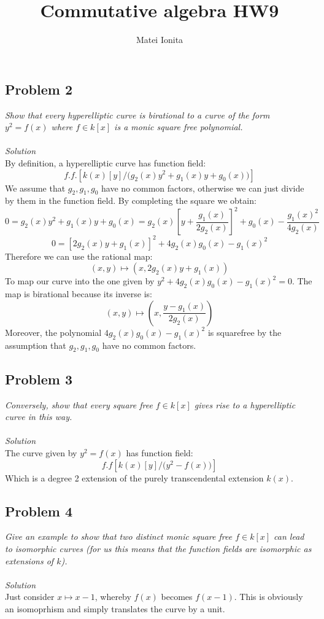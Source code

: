 \documentclass[12 pt]{article}
\title{Commutative algebra HW9}
\author{Matei Ionita}
\begin{document}
  \maketitle


\subsection*{Problem 2}
\emph{Show that every hyperelliptic curve is birational to a curve of the form $y^2 = f(x)$ where $f \in k[x]$ is a monic square free polynomial.}
\\
\\
\emph{Solution}
\\
By definition, a hyperelliptic curve has function field:
\[        f.f. \left[  k(x)[y]/\big(  g_2(x) y^2 + g_1(x) y + g_0(x) \big)   \right]     \]
We assume that $g_2, g_1, g_0$ have no common factors, otherwise we can just divide by them in the function field. By completing the square we obtain:
\[    0 =   g_2(x) y^2 + g_1(x) y + g_0(x) =  g_2(x)  \left[ y + \frac{g_1(x)}{2 g_2(x)} \right]^2  + g_0(x) - \frac{g_1(x)^2}{4 g_2(x)}   \]
\[       0 = \left[ 2 g_2(x) y + g_1(x) \right]^2   + 4 g_2(x) g_0(x) - g_1(x)^2      \]
Therefore we can use the rational map:
\[           (x,y) \mapsto \left( x,   2 g_2(x) y + g_1(x)  \right)          \]
To map our curve into the one given by $y^2 + 4 g_2(x) g_0(x) - g_1(x)^2= 0$. The map is birational because its inverse is:
\[           (x,y) \mapsto \left( x,  \frac{y - g_1(x)}{2g_2(x)}   \right)          \]
Moreover, the polynomial $4 g_2(x) g_0(x) - g_1(x)^2$ is squarefree by the assumption that $g_2, g_1, g_0$ have no common factors.


\subsection*{Problem 3}
\emph{Conversely, show that every square free $f \in k[x]$ gives rise to a hyperelliptic curve in this way.}
\\
\\
\emph{Solution}
\\
The curve given by $y^2 = f(x)$ has function field:
\[       f.f \left[  k(x)[y]/ \big( y^2 - f(x)  \big) \right]       \]
Which is a degree 2 extension of the purely transcendental extension $k(x)$.


\subsection*{Problem 4}
\emph{Give an example to show that two distinct monic square free $f \in k[x]$ can lead to isomorphic curves (for us this means that the function fields are isomorphic as extensions of $k$).}
\\
\\
\emph{Solution}
\\
Just consider $x \mapsto x-1$, whereby $f(x)$ becomes $f(x-1)$. This is obviously an isomoprhism and simply translates the curve by a unit.
\end{document}
